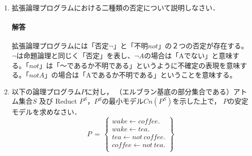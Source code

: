 \documentclass[dvipdfmx]{jsarticle}
\begin{document}
\begin{enumerate}
\item 拡張論理プログラムにおける二種類の否定について説明しなさい．
\paragraph{解答}拡張論理プログラムには「否定$\neg$」と「不明$not$」の２つの否定が存在する。$\neg$は命題論理と同じく「否定」を表し、$\neg A$の場合は「Aでない」と意味する。「$not$」は「〜であるか不明である」というように不確定の表現を意味する。「$not A$」の場合は「Aであるか不明である」ということを意味する。



\item 以下の論理プログラム$P$に対し，
  （エルブラン基底の部分集合である）アトム集合$S$
  及び Reduct $P^S$，$P^S$の最小モデル$Cn(P^S)$を示した上で，
  $P$の安定モデルを求めなさい．
  \[
  P\,=\,\left\{
  \begin{array}{l}
    wake \leftarrow coffee.\\
    wake \leftarrow tea.\\
    tea \leftarrow not~ coffee.\\
    coffee \leftarrow not~ tea.\\
  \end{array}
  \right\}
  \]

\end{enumerate}
\end{document}
